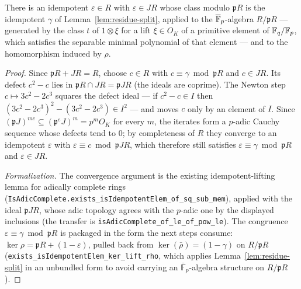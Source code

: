 \begin{lemma}
\label{lem:idempotent}
\leanok
There is an idempotent $\varepsilon \in R$ with $\varepsilon \in JR$ whose class modulo
$\mathfrak p R$ is the idempotent $\gamma$ of Lemma~\ref{lem:residue-split}, applied to
the $\overline{\mathbb{F}}_p$-algebra $R/\mathfrak p R$ --- generated by the class $t$ of $1 \otimes \xi$
for a lift $\xi \in O_K$ of a primitive element of $\mathbb{F}_q/\mathbb{F}_p$, which satisfies the
separable minimal polynomial of that element --- and to the homomorphism induced by
$\rho$.
\end{lemma}
\begin{proof}
\leanok
Since $\mathfrak p R + JR = R$, choose $c \in R$ with $c \equiv \gamma \bmod \mathfrak p R$
and $c \in JR$. Its defect $c^2 - c$ lies in
$\mathfrak p R \cap JR = \mathfrak p J R$ (the ideals are coprime). The Newton step
$c \mapsto 3c^2 - 2c^3$ squares the defect ideal --- if $c^2 - c \in I$ then
$(3c^2-2c^3)^2 - (3c^2-2c^3) \in I^2$ --- and moves $c$ only by an element of $I$.
Since $(\mathfrak p J)^{me} \subseteq (\mathfrak p^e J)^m = p^m O_K$ for every $m$, the
iterates form a $p$-adic Cauchy sequence whose defects tend to $0$; by completeness of
$R$ they converge to an idempotent $\varepsilon$ with
$\varepsilon \equiv c \bmod \mathfrak p J R$, which therefore still satisfies
$\varepsilon \equiv \gamma \bmod \mathfrak p R$ and $\varepsilon \in JR$.

\emph{Formalization.} The convergence argument is the existing idempotent-lifting lemma
for adically complete rings (\texttt{IsAdicComplete.exists\_isIdempotentElem\_of\_sq\_sub\_mem}),
applied with the ideal $\mathfrak p J R$, whose adic topology agrees with the $p$-adic
one by the displayed inclusions (the transfer is
\texttt{isAdicComplete\_of\_le\_of\_pow\_le}). The congruence
$\varepsilon \equiv \gamma \bmod \mathfrak p R$ is packaged in the form the next steps
consume: $\ker \rho = \mathfrak p R + (1 - \varepsilon)$, pulled back from
$\ker(\bar\rho) = (1 - \gamma)$ on $R/\mathfrak p R$
(\texttt{exists\_isIdempotentElem\_ker\_lift\_rho}, which applies
Lemma~\ref{lem:residue-split} in an unbundled form to avoid carrying an
$\overline{\mathbb F}_p$-algebra structure on $R/\mathfrak p R$).
\end{proof}

